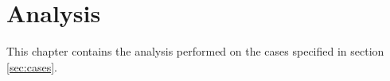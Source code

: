 \chapter{Analysis}\label{cha:analysis}
This chapter contains the analysis performed on the cases specified in section \ref{sec:cases}. 





    
    




    


    
    


    



